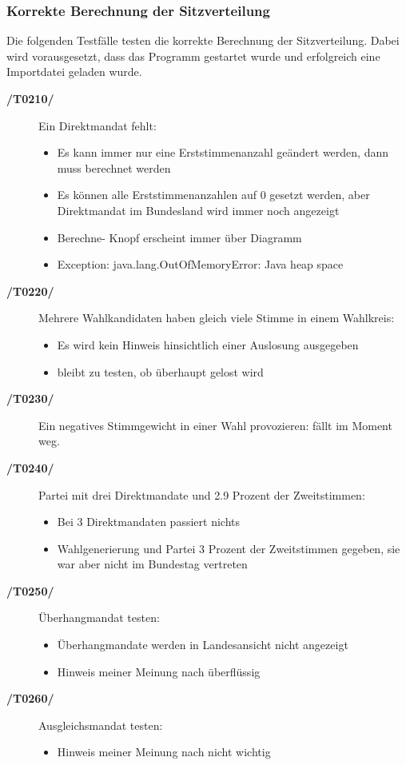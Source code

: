 \documentclass[12pt,a4paper,titlepage]{article}
\begin{document}
\subsubsection{Korrekte Berechnung der Sitzverteilung}
Die folgenden Testfälle testen die korrekte Berechnung der Sitzverteilung. Dabei wird vorausgesetzt, dass  das Programm gestartet wurde und erfolgreich eine Importdatei geladen wurde.
\begin{description}
	\item[\textbf{/T0210/}] Ein Direktmandat fehlt: \newline
	\begin{itemize}
	\item Es kann immer nur eine Erststimmenanzahl geändert werden, dann muss berechnet werden
	\item Es können alle Erststimmenanzahlen auf 0 gesetzt werden, aber Direktmandat im Bundesland wird immer noch angezeigt
	\item Berechne- Knopf erscheint immer über Diagramm
	\item Exception: java.lang.OutOfMemoryError: Java heap space
	\end{itemize}
	
	\item[\textbf{/T0220/}] Mehrere Wahlkandidaten haben gleich viele Stimme in einem Wahlkreis: \newline
	\begin{itemize}
	\item Es wird kein Hinweis hinsichtlich einer Auslosung ausgegeben
	\item bleibt zu testen, ob überhaupt gelost wird
	\end{itemize}
	\item[\textbf{/T0230/}] Ein negatives Stimmgewicht in einer Wahl provozieren:
	fällt im Moment weg.
	\item[\textbf{/T0240/}] Partei mit drei Direktmandate und 2.9 Prozent der Zweitstimmen: \newline
	\begin{itemize}
	\item Bei 3 Direktmandaten passiert nichts
	\item Wahlgenerierung und Partei 3 Prozent der Zweitstimmen gegeben, sie war aber nicht im Bundestag vertreten
	\end{itemize}
	
	\item[\textbf{/T0250/}] Überhangmandat testen: \newline
\begin{itemize}
\item Überhangmandate werden in Landesansicht nicht angezeigt
\item Hinweis meiner Meinung nach überflüssig
\end{itemize}
	\item[\textbf{/T0260/}] Ausgleichsmandat testen: \newline
\begin{itemize}
\item Hinweis meiner Meinung nach nicht wichtig


\end{itemize}
\end{description}
\end{document}
